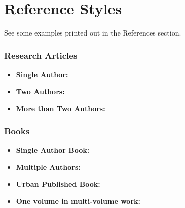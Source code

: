 \part{Reference Styles}
See some examples printed out in the References section.

\section{Research Articles}
\begin{itemize}
    \item \textbf{Single Author:}
    \citet{bowen2018data}
    \item \textbf{Two Authors:}
    \citet{bowen1728philosophy}
    \item \textbf{More than Two Authors:} \citet{barrientos2021feasibility}
\end{itemize}

\section{Books}

\begin{itemize}
    \item \textbf{Single Author Book:} \citet{schwabish2020elevate}
    \item \textbf{Multiple Authors:} \citet{burman2020taxes}
    \item \textbf{Urban Published Book:}
    \citet{cordes2009nonprofits}
    \item \textbf{One volume in multi-volume work:} \citet{bowen2021book}
\end{itemize}


